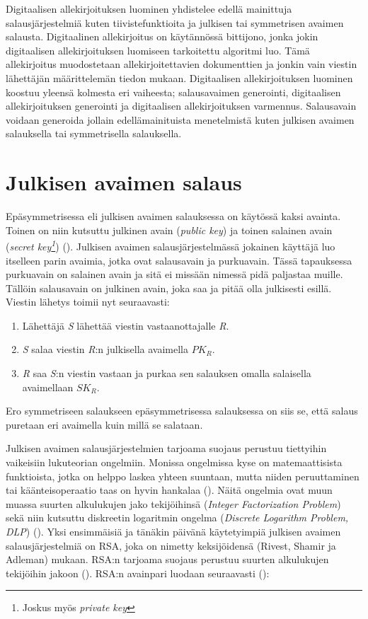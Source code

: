  Digitaalisen allekirjoituksen luominen yhdistelee edellä mainittuja salausjärjestelmiä kuten tiivistefunktioita ja julkisen tai symmetrisen avaimen salausta. Digitaalinen allekirjoitus on käytännössä bittijono, jonka jokin digitaalisen allekirjoituksen luomiseen tarkoitettu algoritmi luo. Tämä allekirjoitus muodostetaan allekirjoitettavien dokumenttien ja jonkin vain viestin lähettäjän määrittelemän tiedon mukaan. Digitaalisen allekirjoituksen luominen koostuu yleensä kolmesta eri vaiheesta; salausavaimen generointi, digitaalisen allekirjoituksen generointi ja digitaalisen allekirjoituksen varmennus. Salausavain voidaan generoida jollain edellämainituista menetelmistä kuten julkisen avaimen salauksella tai symmetrisella salauksella.
 
  \section{Julkisen avaimen salaus}
 Epäsymmetrisessa eli julkisen avaimen salauksessa on käytössä kaksi avainta. Toinen on niin kutsuttu julkinen avain (\emph{public key}) ja toinen salainen avain (\emph{secret key\footnote{Joskus myös \emph{private key}}}) (\cite{bellare2005introduction}). Julkisen avaimen salausjärjestelmässä jokainen käyttäjä luo itselleen parin avaimia, jotka ovat salausavain ja purkuavain. Tässä tapauksessa purkuavain on salainen avain ja sitä ei missään nimessä pidä paljastaa muille. Tällöin salausavain on julkinen avain, joka saa ja pitää olla julkisesti esillä. Viestin lähetys toimii nyt seuraavasti:
 
 \begin{enumerate}
     \item Lähettäjä \emph{S} lähettää viestin vastaanottajalle \emph{R}.
     \item \emph{S} salaa viestin \emph{R}:n julkisella avaimella $PK_{R}$.
     \item \emph{R} saa \emph{S}:n viestin vastaan ja purkaa sen salauksen omalla salaisella avaimellaan $SK_{R}$.
 \end{enumerate}
Ero symmetriseen salaukseen epäsymmetrisessa salauksessa on siis se, että salaus puretaan eri avaimella kuin millä se salataan.
 
  Julkisen avaimen salausjärjestelmien tarjoama suojaus perustuu tiettyihin vaikeisiin lukuteorian ongelmiin. Monissa ongelmissa kyse on matemaattisista funktioista, jotka on helppo laskea yhteen suuntaan, mutta niiden peruuttaminen tai käänteisoperaatio taas on hyvin hankalaa (\cite{mavroeidis2018impact}). Näitä ongelmia ovat muun muassa suurten alkulukujen jako tekijöihinsä (\emph{Integer Factorization Problem}) sekä niin kutsuttu diskreetin logaritmin ongelma (\emph{Discrete Logarithm Problem, DLP}) (\cite{10.1007/978-3-319-11659-4_15}).
  Yksi ensimmäisiä ja tänäkin päivänä käytetyimpiä julkisen avaimen salausjärjestelmiä on RSA, joka on nimetty keksijöidensä (Rivest, Shamir ja Adleman) mukaan. RSA:n tarjoama suojaus perustuu suurten alkulukujen tekijöihin jakoon (\cite{montgomery1994survey}). RSA:n avainpari luodaan seuraavasti  (\cite{doi:10.1080/23742917.2016.1226650}):
  
